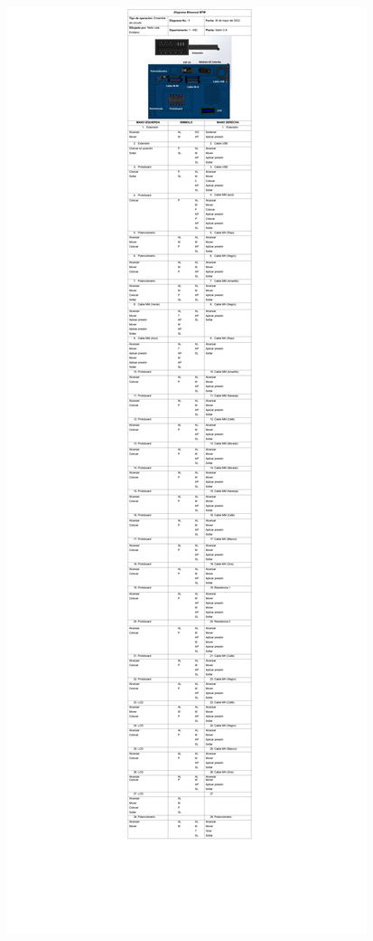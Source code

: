     \begin{figure}[H]
        \centering
        \includegraphics[trim = {260mm 530mm 250mm 750mm},clip,scale=0.25]{19/Img/diagramaBimanual2.pdf}
        \newpage
        \label{fig:diagramaBimanual22}    
    \end{figure}
